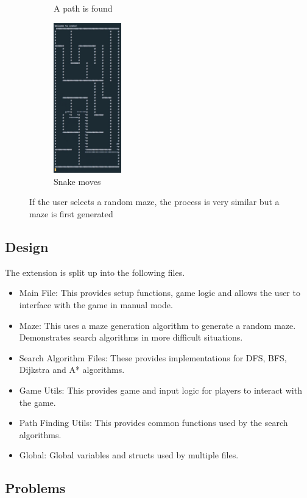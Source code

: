 \documentclass[11pt]{article}
\begin{document}
\begin{figure}[H]
\begin{subfigure}{0.24\textwidth}
    \caption{A path is found}
    \label{fig:subim10}
\end{subfigure}
\begin{subfigure}{0.24\textwidth}
    \centering
    \includegraphics[height=6.5cm]{A_Star_Move_Maze}
    \caption{Snake moves}
    \label{fig:subim11}
\end{subfigure}

\caption{If the user selects a random maze, the process is very similar but a maze is first generated}
\label{fig:image3}
\end{figure}

\subsection{Design}

The extension is split up into the following files.
\begin{itemize}
    \item Main File: This provides setup functions, game logic and allows the user to interface with the game in manual mode.
    \item Maze: This uses a maze generation algorithm to generate a random maze. Demonstrates search algorithms in more difficult situations.
    \item Search Algorithm Files: These provides implementations for DFS, BFS, Dijkstra and A* algorithms.
    \item Game Utils: This provides game and input logic for players to interact with the game.
    \item Path Finding Utils: This provides common functions used by the search algorithms.
    \item Global: Global variables and structs used by multiple files.
\end{itemize}

\subsection{Problems}
\end{document}
